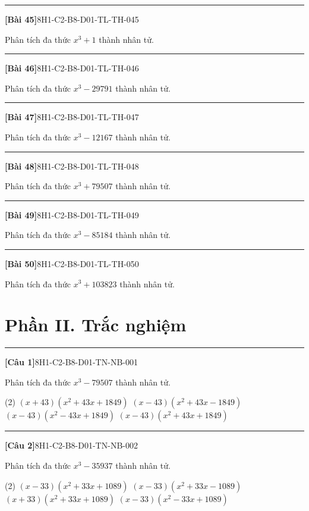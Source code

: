 \documentclass[12pt,a4paper]{article}
\newif\ifloigiai
\newenvironment{cauhoi}[2]{%
  \par\medskip\noindent\rule{\textwidth}{0.4pt}\par\nopagebreak
  \noindent\textbf{[#1]}\hfill{\scriptsize\ttfamily #2}\par\nopagebreak\smallskip}{\par}
\newcommand{\loigiai}[1]{\ifloigiai\par\smallskip\noindent\textit{Lời giải.} #1\par\fi}
\newcommand{\dapan}[1]{\ifloigiai\par\smallskip\noindent\textit{Đáp án:} \textbf{#1}\par\fi}
\begin{document}
\begin{cauhoi}{Bài 45}{8H1-C2-B8-D01-TL-TH-045}
Phân tích đa thức $x^{3}+1$ thành nhân tử.
\loigiai{Áp dụng hằng đẳng thức $a^{3}+b^{3}=(a+b)(a^{2}-ab+b^{2})$ với $b=1$: $x^{3}+1=(x+1)(x^{2}-x+1)$.}
\end{cauhoi}
\begin{cauhoi}{Bài 46}{8H1-C2-B8-D01-TL-TH-046}
Phân tích đa thức $x^{3}-29791$ thành nhân tử.
\loigiai{Áp dụng hằng đẳng thức $a^{3}-b^{3}=(a-b)(a^{2}+ab+b^{2})$ với $b=31$: $x^{3}-29791=(x-31)(x^{2}+31x+961)$.}
\end{cauhoi}
\begin{cauhoi}{Bài 47}{8H1-C2-B8-D01-TL-TH-047}
Phân tích đa thức $x^{3}-12167$ thành nhân tử.
\loigiai{Áp dụng hằng đẳng thức $a^{3}-b^{3}=(a-b)(a^{2}+ab+b^{2})$ với $b=23$: $x^{3}-12167=(x-23)(x^{2}+23x+529)$.}
\end{cauhoi}
\begin{cauhoi}{Bài 48}{8H1-C2-B8-D01-TL-TH-048}
Phân tích đa thức $x^{3}+79507$ thành nhân tử.
\loigiai{Áp dụng hằng đẳng thức $a^{3}+b^{3}=(a+b)(a^{2}-ab+b^{2})$ với $b=43$: $x^{3}+79507=(x+43)(x^{2}-43x+1849)$.}
\end{cauhoi}
\begin{cauhoi}{Bài 49}{8H1-C2-B8-D01-TL-TH-049}
Phân tích đa thức $x^{3}-85184$ thành nhân tử.
\loigiai{Áp dụng hằng đẳng thức $a^{3}-b^{3}=(a-b)(a^{2}+ab+b^{2})$ với $b=44$: $x^{3}-85184=(x-44)(x^{2}+44x+1936)$.}
\end{cauhoi}
\begin{cauhoi}{Bài 50}{8H1-C2-B8-D01-TL-TH-050}
Phân tích đa thức $x^{3}+103823$ thành nhân tử.
\loigiai{Áp dụng hằng đẳng thức $a^{3}+b^{3}=(a+b)(a^{2}-ab+b^{2})$ với $b=47$: $x^{3}+103823=(x+47)(x^{2}-47x+2209)$.}
\end{cauhoi}
\clearpage\section*{Phần II. Trắc nghiệm}
\begin{cauhoi}{Câu 1}{8H1-C2-B8-D01-TN-NB-001}
Phân tích đa thức $x^{3}-79507$ thành nhân tử.
\begin{tasks}(2)
\task $(x+43)(x^{2}+43x+1849)$
\task $(x-43)(x^{2}+43x-1849)$
\task $(x-43)(x^{2}-43x+1849)$
\task $(x-43)(x^{2}+43x+1849)$
\end{tasks}
\dapan{D}
\end{cauhoi}
\begin{cauhoi}{Câu 2}{8H1-C2-B8-D01-TN-NB-002}
Phân tích đa thức $x^{3}-35937$ thành nhân tử.
\begin{tasks}(2)
\task $(x-33)(x^{2}+33x+1089)$
\task $(x-33)(x^{2}+33x-1089)$
\task $(x+33)(x^{2}+33x+1089)$
\task $(x-33)(x^{2}-33x+1089)$
\end{tasks}
\dapan{A}
\end{cauhoi}
\end{document}
